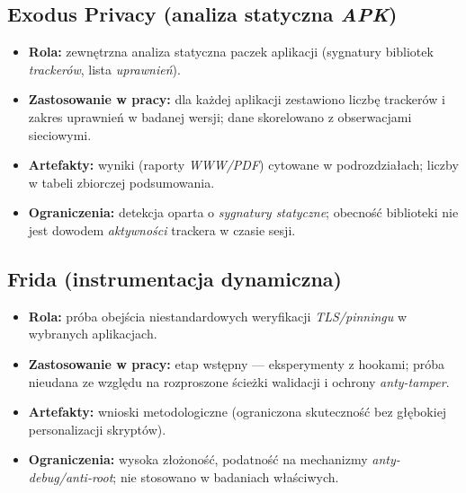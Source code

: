\subsection*{Exodus Privacy (analiza statyczna \emph{APK})}
\begin{itemize}
  \item \textbf{Rola:} zewnętrzna analiza statyczna paczek aplikacji (sygnatury bibliotek \emph{trackerów}, lista \emph{uprawnień}).
  \item \textbf{Zastosowanie w pracy:} dla każdej aplikacji zestawiono liczbę trackerów i zakres uprawnień w badanej wersji; dane skorelowano z obserwacjami sieciowymi.
  \item \textbf{Artefakty:} wyniki (raporty \emph{WWW/PDF}) cytowane w podrozdziałach; liczby w tabeli zbiorczej podsumowania.
  \item \textbf{Ograniczenia:} detekcja oparta o \emph{sygnatury statyczne}; obecność biblioteki nie jest dowodem \emph{aktywności} trackera w czasie sesji.
\end{itemize}

\subsection*{Frida (instrumentacja dynamiczna)}
\begin{itemize}
  \item \textbf{Rola:} próba obejścia niestandardowych weryfikacji \emph{TLS/pinningu} w wybranych aplikacjach.
  \item \textbf{Zastosowanie w pracy:} etap wstępny — eksperymenty z hookami; próba nieudana ze względu na rozproszone ścieżki walidacji i ochrony \emph{anty-tamper}.
  \item \textbf{Artefakty:} wnioski metodologiczne (ograniczona skuteczność bez głębokiej personalizacji skryptów).
  \item \textbf{Ograniczenia:} wysoka złożoność, podatność na mechanizmy \emph{anty-debug/anti-root}; nie stosowano w badaniach właściwych.
\end{itemize}
